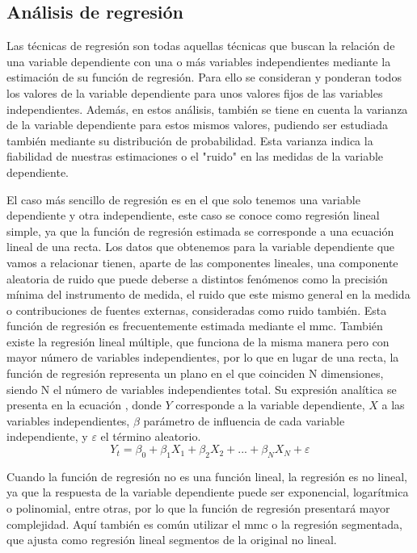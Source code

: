 \subsection{Análisis de regresión}
\par Las técnicas de regresión son todas aquellas técnicas que buscan la relación de una variable dependiente con una o más variables independientes mediante la estimación de su función de regresión. Para ello se consideran y ponderan todos los valores de la variable dependiente para unos valores fijos de las variables independientes. Además, en estos análisis, también se tiene en cuenta la varianza de la variable dependiente para estos mismos valores, pudiendo ser estudiada también mediante su distribución de probabilidad. Esta varianza indica la fiabilidad de nuestras estimaciones o el "ruido" en las medidas de la variable dependiente. 
\\
\par El caso más sencillo de regresión es en el que solo tenemos una variable dependiente y otra independiente, este caso se conoce como regresión lineal simple, ya que la función de regresión estimada se corresponde a una ecuación lineal de una recta. Los datos que obtenemos para la variable dependiente que vamos a relacionar tienen, aparte de las componentes lineales, una componente aleatoria de ruido que puede deberse a distintos fenómenos como la precisión mínima del instrumento de medida, el ruido que este mismo general en la medida o contribuciones de fuentes externas, consideradas como ruido también. Esta función de regresión es frecuentemente estimada mediante el \gls{mmc}. También existe la regresión lineal múltiple, que funciona de la misma manera pero con mayor número de variables independientes, por lo que en lugar de una recta, la función de regresión representa un plano en el que coinciden N dimensiones, siendo N el número de variables independientes total. Su expresión analítica se presenta en la ecuación \label{RL}, donde $Y$ corresponde a la variable dependiente, $X$ a las variables independientes, $\beta$ parámetro de influencia de cada variable independiente, y $\varepsilon$ el término aleatorio.
\\
\begin{equation} \label{RL}
Y_{t}=\beta _{0}+\beta _{1} X_{1}+\beta _{2} X_{2}+...+\beta _{N} X_{N}+\varepsilon 
\end{equation}
\par Cuando la función de regresión no es una función lineal, la regresión es no lineal, ya que la respuesta de la variable dependiente puede ser exponencial, logarítmica o polinomial, entre otras, por lo que la función de regresión presentará mayor complejidad. Aquí también es común utilizar el \gls{mmc} o la regresión segmentada, que ajusta como regresión lineal segmentos de la original no lineal.
